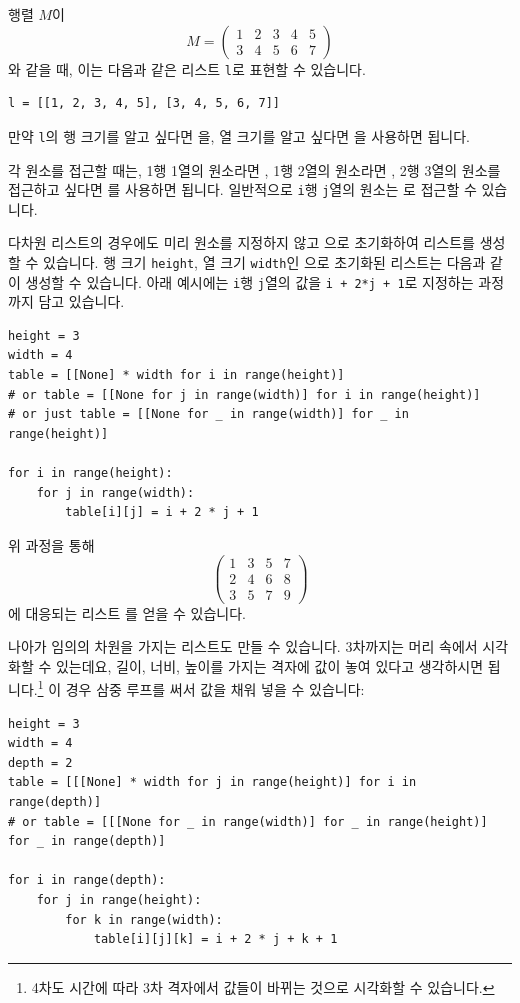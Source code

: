 \documentclass[../main.tex]{subfiles}
\begin{document}
행렬 $M$이
\[M = \begin{pmatrix}
    1 & 2 & 3 & 4 & 5 \\
    3 & 4 & 5 & 6 & 7
\end{pmatrix}\]
와 같을 때, 이는 다음과 같은 리스트 \verb/l/로 표현할 수 있습니다.
\begin{verbatim}
l = [[1, 2, 3, 4, 5], [3, 4, 5, 6, 7]]
\end{verbatim}

만약 \texttt{l}의 행 크기를 알고 싶다면 을, 열 크기를 알고 싶다면 을 사용하면 됩니다.

각 원소를 접근할 때는, 1행 1열의 원소라면 , 1행 2열의 원소라면 , 2행 3열의 원소를 접근하고 싶다면 를 사용하면 됩니다.
일반적으로 \texttt{i}행 \texttt{j}열의 원소는 로 접근할 수 있습니다.

다차원 리스트의 경우에도 미리 원소를 지정하지 않고 으로 초기화하여 리스트를 생성할 수 있습니다.
행 크기 \texttt{height}, 열 크기 \texttt{width}인 으로 초기화된 리스트는 다음과 같이 생성할 수 있습니다.
아래 예시에는 \texttt{i}행 \texttt{j}열의 값을 \texttt{i + 2*j + 1}로 지정하는 과정까지 담고 있습니다.
\begin{verbatim}
height = 3
width = 4
table = [[None] * width for i in range(height)]
# or table = [[None for j in range(width)] for i in range(height)]
# or just table = [[None for _ in range(width)] for _ in range(height)]

for i in range(height):
    for j in range(width):
        table[i][j] = i + 2 * j + 1
\end{verbatim}
위 과정을 통해
\[
  \begin{pmatrix}
    1 & 3 & 5 & 7\\
    2 & 4 & 6 & 8\\
    3 & 5 & 7 & 9
  \end{pmatrix}
\]
에 대응되는 리스트 \pyin{[[1, 3, 5, 7], [2, 4, 6, 8], [3, 5, 7, 9]]}를 얻을 수 있습니다.

나아가 임의의 차원을 가지는 리스트도 만들 수 있습니다.
3차까지는 머리 속에서 시각화할 수 있는데요, 길이, 너비, 높이를 가지는 격자에 값이 놓여 있다고 생각하시면 됩니다.\footnote{4차도 시간에 따라 3차 격자에서 값들이 바뀌는 것으로 시각화할 수 있습니다.}
이 경우 삼중 루프를 써서 값을 채워 넣을 수 있습니다:
\begin{verbatim}
height = 3
width = 4
depth = 2
table = [[[None] * width for j in range(height)] for i in range(depth)]
# or table = [[[None for _ in range(width)] for _ in range(height)] for _ in range(depth)]

for i in range(depth):
    for j in range(height):
        for k in range(width):
            table[i][j][k] = i + 2 * j + k + 1
\end{verbatim}
\end{document}
